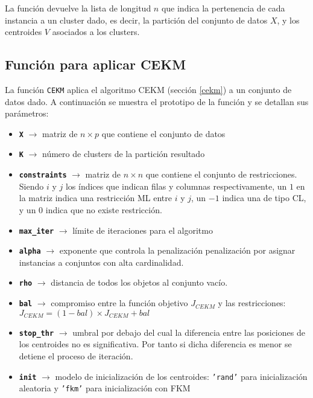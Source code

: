 La función devuelve la lista de longitud $n$ que indica la pertenencia de cada instancia a un cluster dado, es decir, la partición del conjunto de datos $X$, y los centroides $V$ asociados a los clusters.

\subsection{Función para aplicar CEKM}

La función \texttt{CEKM} aplica el algoritmo \acs{CEKM} (sección \ref{cekm}) a un conjunto de datos dado. A continuación se muestra el prototipo de la función y se detallan sus parámetros:


\begin{itemize}
	
	\item \textbf{\texttt{X}} {$\longrightarrow$ matriz de $n \times p$ que contiene el conjunto de datos}
	
	\item \textbf{\texttt{K}} {$\longrightarrow$ número de clusters de la partición resultado}
	
	\item \textbf{\texttt{constraints}} {$\longrightarrow$ matriz de $n \times n$ que contiene el conjunto de restricciones. Siendo $i$ y $j$ los índices que indican filas y columnas respectivamente, un $1$ en la matriz indica una restricción \acs{ML} entre $i$ y $j$, un $-1$ indica una de tipo \acs{CL}, y un $0$ indica que no existe restricción.}
	
	\item \textbf{\texttt{max\_iter}} {$\longrightarrow$ límite de iteraciones para el algoritmo}
	
	\item \textbf{\texttt{alpha}} {$\longrightarrow$ exponente que controla la penalización penalización por asignar instancias a conjuntos con alta cardinalidad.}
	
	\item \textbf{\texttt{rho}} {$\longrightarrow$ distancia de todos los objetos al conjunto vacío.}
	
	\item \textbf{\texttt{bal}} {$\longrightarrow$ compromiso entre la función objetivo $J_{CEKM}$ y las restricciones: $J_{CEKM} = (1-bal) \times J_{CEKM} + bal$}
	
	\item \textbf{\texttt{stop\_thr}} {$\longrightarrow$ umbral por debajo del cual la diferencia entre las posiciones de los centroides no es significativa. Por tanto si dicha diferencia es menor se detiene el proceso de iteración.}
	
	\item \textbf{\texttt{init}} {$\longrightarrow$ modelo de inicialización de los centroides: \texttt{'rand'} para inicialización aleatoria y \texttt{'fkm'} para inicialización con \acf{FKM}}
	
\end{itemize}

